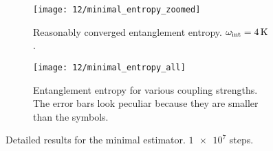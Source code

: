 \begin{figure}
	\setlength{\figspacing}{5 mm}
	\centering
	\begin{subfigure}[b]{\textwidth}
		\texttt{[image: 12/minimal\_entropy\_zoomed]}
		\caption{
			Reasonably converged entanglement entropy.
			$\omega_\text{int} = \SI{4}{\kelvin}$.
		}
		\label{fig:minimal-entropy-zoomed}
		\vspace{\figspacing}
	\end{subfigure}
	\begin{subfigure}[b]{\textwidth}
		\texttt{[image: 12/minimal\_entropy\_all]}
		\caption{
			Entanglement entropy for various coupling strengths.
			The error bars look peculiar because they are smaller than the symbols.
		}
		\label{fig:minimal-entropy-all}
	\end{subfigure}
	\caption[
		Results for minimal estimator
	]{
		Detailed results for the minimal estimator.
		$\num{1e7}$ steps.
		\explainplotentropy{}
	}
\end{figure}
